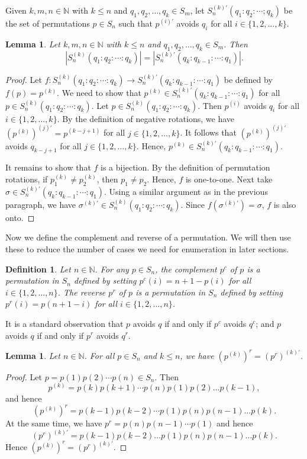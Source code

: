 \documentclass[10pt,a4paper]{amsart}
\newtheorem{lemma}[theorem]{Lemma}
\newtheorem{definition}[theorem]{Definition}
\numberwithin{equation}{section}
\begin{document}
Given $k,m,n\in\mathbb{N}$ with $k\leq n$ and $q_1,q_2,\ldots,q_k\in S_m$, let $S_n^{(k)'}(q_1:q_2:\cdots;q_k)$ be the set of permutations $p\in S_n$ such that $p^{(i)'}$ avoids $q_i$ for all $i\in\{1,2,\ldots,k\}$.
\begin{lemma}\label{Lemma:ClockCounterclock}
Let $k,m,n\in\mathbb{N}$ with $k\leq n$ and $q_1,q_2,\ldots,q_k\in S_m$. Then 
\[
|S_n^{(k)}(q_1:q_2:\cdots:q_k)|=|S_n^{(k)'}(q_k:q_{k-1}: \cdots:q_1)|.
\]
\end{lemma}
\begin{proof}
Let $f:S_n^{(k)}(q_1:q_2:\cdots:q_k)\to S_n^{(k)'}(q_k:q_{k-1}:\cdots:q_1)$ be defined by $f(p)=p^{(k)}$. We need to show that $p^{(k)}\in S_n^{(k)'}(q_k:q_{k-1}:\cdots:q_1)$ for all $p\in S_n^{(k)}(q_1:q_2:\cdots:q_k)$. Let $p\in S_n^{(k)}(q_1:q_2:\cdots:q_k)$. Then $p^{(i)}$ avoids $q_i$ for all $i\in\{1,2,\ldots,k\}$. By the definition of negative rotations, we have $(p^{(k)})^{(j)'}=p^{(k-j+1)}$ for all $j\in\{1,2,\ldots,k\}$. It follows that $(p^{(k)})^{(j)'}$ avoids $q_{k-j+1}$ for all $j\in\{1,2,\ldots,k\}$. Hence, $p^{(k)}\in S_n^{(k)'}(q_k:q_{k-1}:\cdots:q_1)$.

It remains to show that $f$ is a bijection. By the definition of permutation rotations, if $p_1^{(k)}\neq p_2^{(k)}$, then $p_1\neq p_2$. Hence, $f$ is one-to-one. Next take $\sigma\in S_n^{(k)'}(q_k:q_{k-1}:\cdots:q_1)$. 
Using a similar argument as in the previous paragraph, we have $\sigma^{(k)'}\in S_n^{(k)}(q_1:q_2:\cdots:q_k)$. Since $f(\sigma^{(k)'})=\sigma$, $f$ is also onto.
\end{proof}
Now we define the complement and reverse of a permutation. We will then use these to reduce the number of cases we need for enumeration in later sections.

\begin{definition}\label{Definition:Complements}
Let $n\in\mathbb{N}$. For any $p\in S_n$, the {\em complement} $p^c$ of $p$ is a permutation in $S_n$ defined by setting 
$p^c(i)=n+1-p(i)$ for all $i\in\{1,2,\ldots,n\}$. The {\em reverse} $p^r$ of $p$ is a permutation in $S_n$ defined by setting $p^r(i)=p(n+1-i)$ for all $i\in\{1,2,\ldots,n\}$. 
\end{definition}

It is a standard observation that $p$ avoids $q$ if and only if $p^c$ avoids $q^c$; and $p$ avoids $q$ if and only if $p^r$ avoids $q^r$.

\begin{lemma}\label{Lemma:DirectionInverse}
Let $n\in\mathbb{N}$. For all $p\in S_n$ and $k\leq n$, we have $(p^{(k)})^r=(p^r)^{(k)'}$.
\end{lemma}
\begin{proof}
    Let $p=p(1)p(2)\cdots p(n)\in S_n$. Then
    \[
    p^{(k)}=p(k)p(k+1)\cdots p(n)p(1)p(2)\ldots p(k-1),
    \]
    and hence
    \[
    (p^{(k)})^r=p(k-1)p(k-2)\cdots p(1)p(n)p(n-1)\ldots p(k).
    \]
At the same time, we have $p^r=p(n)p(n-1)\cdots p(1)$ and hence
\[
(p^r)^{(k)'}=p(k-1)p(k-2)\ldots p(1)p(n)p(n-1)\ldots p(k).
\]
Hence $(p^{(k)})^r=(p^r)^{(k)'}$.
\end{proof}
\end{document}
